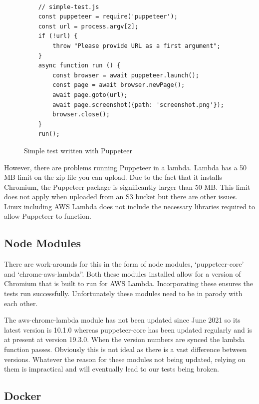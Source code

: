 \documentclass[12pt,a4paper,titlepage]{report}
\begin{document}
\begin{figure}
  \begin{tcolorbox}
    \begin{verbatim}

    // simple-test.js
    const puppeteer = require('puppeteer');
    const url = process.argv[2];
    if (!url) {
        throw "Please provide URL as a first argument";
    }
    async function run () {
        const browser = await puppeteer.launch();
        const page = await browser.newPage();
        await page.goto(url);
        await page.screenshot({path: 'screenshot.png'});
        browser.close();
    }
    run();

  \end{verbatim}
  \end{tcolorbox}
  \caption{Simple test written with Puppeteer}
\end{figure}

However, there are problems running Puppeteer in a lambda. Lambda has a 50 MB limit on the zip file you can upload.
Due to the fact that it installs Chromium, the Puppeteer package is significantly larger than 50 MB.
This limit does not apply when uploaded from an S3 bucket but there are other issues.
Linux including AWS Lambda does not include the necessary libraries required to allow Puppeteer to function.

\subsection{Node Modules}

There are work-arounds for this in the form of node modules, ‘puppeteer-core’ and ‘chrome-aws-lambda”.
Both these modules installed allow for a version of Chromium that is built to run for AWS Lambda. Incorporating
these ensures the tests run successfully. Unfortunately these modules need to be in parody with each other.

The aws-chrome-lambda module has not been updated since June 2021 so its latest version is 10.1.0 whereas
puppeteer-core has been updated regularly and is at present at version 19.3.0. When the version numbers are
synced the lambda function passes. Obviously this is not ideal as there is a vast difference between versions.
Whatever the reason for these modules not being updated, relying on them is impractical and will eventually lead to our tests being broken.

\subsection{Docker}
\end{document}

